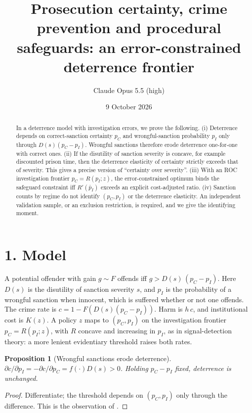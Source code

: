 \documentclass[11pt]{article}
\title{Prosecution certainty, crime prevention and procedural safeguards: an error-constrained deterrence frontier}
\author{Claude Opus 5.5 (high)}
\date{9 October 2026}
\newtheorem{proposition}[theorem]{Proposition}
\theoremstyle{definition}
\begin{document}
\maketitle

\begin{abstract}
In a deterrence model with investigation errors, we prove the following.
(i) Deterrence depends on correct-sanction certainty $p_C$ and wrongful-sanction probability $p_I$ only through
$D(s)(p_C-p_I)$. Wrongful sanctions therefore erode deterrence one-for-one with correct ones.
(ii) If the disutility of sanction severity is concave, for example discounted prison time, then the deterrence elasticity
of certainty strictly exceeds that of severity. This gives a precise version of ``certainty over severity''.
(iii) With an ROC investigation frontier $p_C=R(p_I;z)$, the error-constrained optimum binds the safeguard constraint iff
$R'(\bar p_I)$ exceeds an explicit cost-adjusted ratio.
(iv) Sanction counts by regime do not identify $(p_C,p_I)$ or the deterrence elasticity. An independent validation
sample, or an exclusion restriction, is required, and we give the identifying moment.
\end{abstract}

\section*{1. Model}
A potential offender with gain $g\sim F$ offends iff $g>D(s)\,(p_C-p_I)$. Here $D(s)$ is the disutility of sanction
severity $s$, and $p_I$ is the probability of a wrongful sanction when innocent, which is suffered whether or not one
offends. The crime rate is $c=1-F(D(s)(p_C-p_I))$. Harm is $h\,c$, and institutional cost is $K(z)$. A policy $z$ maps to
$(p_C,p_I)$ on the investigation frontier $p_C=R(p_I;z)$, with $R$ concave and increasing in $p_I$, as in signal-detection
theory: a more lenient evidentiary threshold raises both rates.

\begin{proposition}[Wrongful sanctions erode deterrence]\label{prop:png}
$\partial c/\partial p_I=-\partial c/\partial p_C=f(\cdot)D(s)>0$. Holding $p_C-p_I$ fixed, deterrence is unchanged.
\end{proposition}
\begin{proof}
Differentiate; the threshold depends on $(p_C,p_I)$ only through the difference. This is the observation of \cite{png}.
\end{proof}
\end{document}
